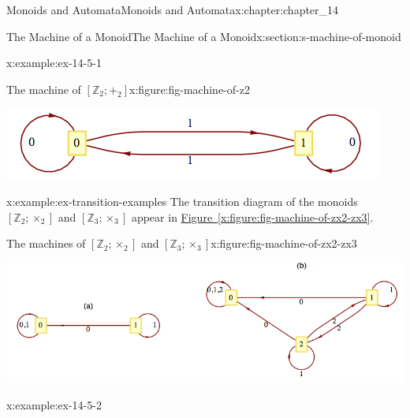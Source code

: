 \documentclass[oneside,10pt,]{book}
\newcommand{\xreffont}{\relax}
\numberwithin{equation}{section}
\begin{document}
\begin{chapterptx}{Monoids and Automata}{}{Monoids and Automata}{}{}{x:chapter:chapter_14}
\begin{sectionptx}{The Machine of a Monoid}{}{The Machine of a Monoid}{}{}{x:section:s-machine-of-monoid}
\begin{example}{}{x:example:ex-14-5-1}
\begin{figureptx}{The machine of \([\mathbb{Z}_2;+_2]\)}{x:figure:fig-machine-of-z2}{}%
\begin{image}{0.15}{0.7}{0.15}%
\includegraphics[width=\linewidth]{images/fig-machine-of-z2.png}
\end{image}%
\tcblower
\end{figureptx}%
\end{example}
\begin{example}{}{x:example:ex-transition-examples}%
The transition diagram of the monoids \(\left[\mathbb{Z}_2;\times _2\right]\) and \(\left[\mathbb{Z}_3;\times _3\right]\) appear in \hyperref[x:figure:fig-machine-of-zx2-zx3]{Figure~{\xreffont\ref{x:figure:fig-machine-of-zx2-zx3}}}.%
\begin{figureptx}{The machines of \([\mathbb{Z}_2;\times_2]\) and \([\mathbb{Z}_3;	\times_3]\)}{x:figure:fig-machine-of-zx2-zx3}{}%
\begin{image}{0.15}{0.7}{0.15}%
\includegraphics[width=\linewidth]{images/fig-machine-of-zx2-zx3.png}
\end{image}%
\tcblower
\end{figureptx}%
\end{example}
\begin{example}{}{x:example:ex-14-5-2}%

\end{example}
\end{sectionptx}
\end{chapterptx}
\end{document}
